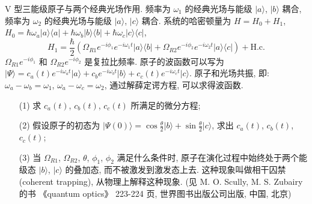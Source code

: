\documentclass{assignment}
\begin{document}
\begin{prob}
    V 型三能级原子与两个经典光场作用. 频率为 $\omega_1$ 的经典光场与能级 $\lvert a\rangle$, $\lvert b\rangle$ 耦合, 频率为 $\omega_2$ 的经典光场与能级 $\lvert a\rangle$, $\lvert c\rangle$ 耦合. 系统的哈密顿量为 $H=H_0+H_1$, $H_0=\hbar\omega_a\lvert a\rangle\langle a\rvert+\hbar\omega_b\lvert b\rangle\langle b\rvert+\hbar\omega_c\lvert c\rangle\langle c\rvert$,
    \[
        H_1=\frac{\hbar}{2}(\Omega_{R1}e^{-i\phi_1}e^{-i\omega_1t}\lvert a\rangle\langle b\rvert+\Omega_{R2}e^{-i\phi_2}e^{-i\omega_2t}\lvert a\rangle\langle c\rvert)+\text{H.c.}
    \]
    $\Omega_{R1}e^{-i\phi_1}$ 和 $\Omega_{R2}e^{-i\phi_2}$ 是复拉比频率. 原子的波函数可以写为 $\lvert\Psi\rangle=c_a(t)e^{-i\omega_at}\lvert a\rangle+c_be^{-i\omega_bt}\lvert b\rangle+c_c(t)e^{-i\omega_ct}\lvert c\rangle$. 原子和光场共振, 即: $\omega_a-\omega_b=\omega_1$, $\omega_a-\omega_c=\omega_2$, 通过解薛定谔方程, 可以求得波函数.
    \begin{itemize}
        \item[(1)] 求 $c_a(t)$, $c_b(t)$, $c_c(t)$ 所满足的微分方程;
        \item[(2)] 假设原子的初态为 $\lvert\Psi(0)\rangle=\cos\frac{\theta}{2}\lvert b\rangle+\sin\frac{\theta}{2}\lvert c\rangle$, 求出 $c_a(t)$, $c_b(t)$, $c_c(t)$;
        \item[(3)] 当 $\Omega_{R1}$, $\Omega_{R2}$, $\theta$, $\phi_1$, $\phi_2$ 满足什么条件时, 原子在演化过程中始终处于两个能级态 $\lvert b\rangle$, $\lvert c\rangle$ 的叠加态, 而不被激发到激发态上去. 这种现象叫做相干囚禁 (coherent trapping), 从物理上解释这种现象. (见 M. O. Scully, M. S. Zubairy 的书 《quantum optics》 223-224 页, 世界图书出版公司出版, 中国, 北京)
    \end{itemize}
\end{prob}
\end{document}
